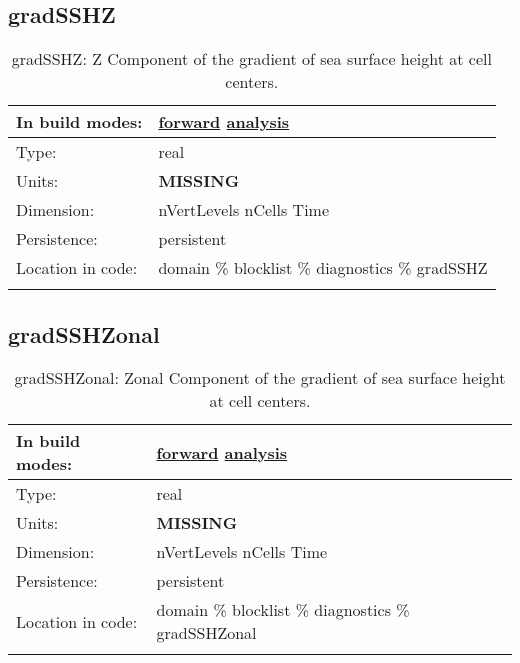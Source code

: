 \subsection[gradSSHZ]{gradSSHZ}
\label{subsec:var_sec_diagnostics_gradSSHZ}
\begin{center}
\begin{longtable}{| p{2.0in} | p{4.0in} |}
        \hline 
        In build modes: & \hyperref[subsec:forward_var_tab_diagnostics]{forward} \hyperref[subsec:analysis_var_tab_diagnostics]{analysis} \\
        \hline 
        Type: & real \\
        \hline 
        Units: & {\bf \color{red} MISSING} \\
        \hline 
        Dimension: & nVertLevels nCells Time \\
        \hline 
        Persistence: & persistent \\
        \hline 
		 Location in code: & domain \% blocklist \% diagnostics \% gradSSHZ \\
		 \hline 
    \caption{gradSSHZ: Z Component of the gradient of sea surface height at cell centers.}
\end{longtable}
\end{center}
\subsection[gradSSHZonal]{gradSSHZonal}
\label{subsec:var_sec_diagnostics_gradSSHZonal}
\begin{center}
\begin{longtable}{| p{2.0in} | p{4.0in} |}
        \hline 
        In build modes: & \hyperref[subsec:forward_var_tab_diagnostics]{forward} \hyperref[subsec:analysis_var_tab_diagnostics]{analysis} \\
        \hline 
        Type: & real \\
        \hline 
        Units: & {\bf \color{red} MISSING} \\
        \hline 
        Dimension: & nVertLevels nCells Time \\
        \hline 
        Persistence: & persistent \\
        \hline 
		 Location in code: & domain \% blocklist \% diagnostics \% gradSSHZonal \\
		 \hline 
    \caption{gradSSHZonal: Zonal Component of the gradient of sea surface height at cell centers.}
\end{longtable}
\end{center}
